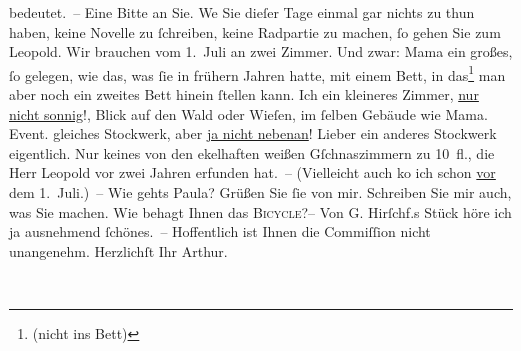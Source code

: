 \begin{ledgroupsized}[t]{13cm}
               bedeutet. – Eine Bitte an Sie. We{\geminationn} Sie dieſer Tage
               einmal gar nichts zu thun haben, keine Novelle zu ſchreiben, keine Radpartie zu
               machen, ſo gehen Sie zum Leopold. Wir brauchen vom 1. Juli an zwei Zimmer. Und zwar: Mama ein großes, ſo gelegen, wie das, was ſie in frühern
               Jahren hatte, mit einem Bett, in das\footnote{\noindent{}(nicht ins Bett)} man aber noch ein zweites Bett hinein ſtellen kann. Ich ein kleineres Zimmer,
                  \uline{nur nicht sonnig}!, Blick auf den Wald oder Wieſen,
               im ſelben Gebäude wie Mama.
               Event. gleiches Stockwerk, aber \uline{ja nicht nebenan}!
               Lieber ein anderes Stockwerk eigentlich. Nur keines von den ekelhaften weißen
               Gſchnaszimmern zu 10 fl., die Herr Leopold vor
                  {\pb}zwei Jahren erfunden hat. – (Vielleicht auch ko{\geminationm} ich schon \uline{vor} dem
                  1. Juli.) –\pend
           \pstart
           Wie gehts Paula? Grüßen Sie ſie von mir.\pend
           \pstart
           Schreiben Sie mir auch, was Sie machen. Wie behagt Ihnen das \textsc{Bicycle}?–\pend
           \pstart
           Von G. Hirſchf.s Stück höre ich ja ausnehmend ſchönes. –\pend
           \pstart
           Hoffentlich ist Ihnen die Commiſſion nicht unangenehm.\pend
           \pstart Herzlichſt Ihr \spacefill\mbox{Arthur.}\pend{}
         
         \endnumbering{}\end{ledgroupsized}  \newcommand{\dateiname}{L00682}\newcommand{\titel}{Arthur Schnitzler an Richard Beer-Hofmann, 5. 6. 1897}\newcommand{\editorInnen}{Martin Anton Müller und Gerd-Hermann Susen}
      